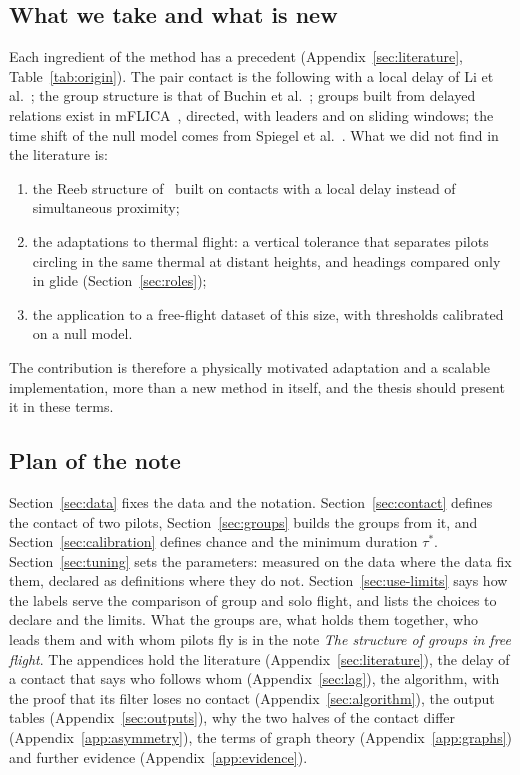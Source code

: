 \subsection{What we take and what is new}

Each ingredient of the method has a precedent (Appendix~\ref{sec:literature},
Table~\ref{tab:origin}). The pair contact is the following with a local delay of Li et
al.~\cite{li2013}; the group structure is that of Buchin et al.~\cite{buchin2015}; groups built
from delayed relations exist in mFLICA~\cite{amornbunchornvej2021}, directed, with leaders and on
sliding windows; the time shift of the null model comes from Spiegel et al.~\cite{spiegel2016}.
What we did not find in the literature is:
\begin{enumerate}[label=(\roman*)]
  \item the Reeb structure of~\cite{buchin2015} built on contacts with a local delay instead of
        simultaneous proximity;
  \item the adaptations to thermal flight: a vertical tolerance that separates pilots circling in
        the same thermal at distant heights, and headings compared only in glide
        (Section~\ref{sec:roles});
  \item the application to a free-flight dataset of this size, with thresholds calibrated on a
        null model.
\end{enumerate}
The contribution is therefore a physically motivated adaptation and a scalable implementation,
more than a new method in itself, and the thesis should present it in these terms.

\subsection{Plan of the note}

Section~\ref{sec:data} fixes the data and the notation. Section~\ref{sec:contact} defines the
contact of two pilots, Section~\ref{sec:groups} builds the groups from it, and
Section~\ref{sec:calibration} defines chance and the minimum duration $\tau^*$.
Section~\ref{sec:tuning} sets the parameters: measured on the data where the data fix them,
declared as definitions where they do not. Section~\ref{sec:use-limits} says how the labels serve the comparison of group and solo
flight, and lists the choices to declare and the limits. What the groups are, what holds them
together, who leads them and with whom pilots fly is in the note \emph{The structure of groups in
free flight}. The appendices hold the literature
(Appendix~\ref{sec:literature}), the delay of a contact that says who follows whom
(Appendix~\ref{sec:lag}), the algorithm, with the proof that its filter loses no contact
(Appendix~\ref{sec:algorithm}), the output tables (Appendix~\ref{sec:outputs}), why the two halves
of the contact differ (Appendix~\ref{app:asymmetry}), the terms of graph theory
(Appendix~\ref{app:graphs}) and further evidence (Appendix~\ref{app:evidence}).
